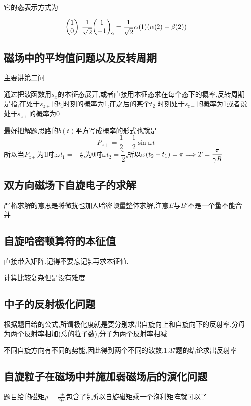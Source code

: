 \documentclass{article}
\begin{document}
            它的态表示方式为

            $$
            \mqty(1 \\ 0)_{1} \frac{1}{\sqrt{2}}\mqty(1 \\ -1)_{2} = \frac{1}{\sqrt{2}} \alpha(1)(\alpha(2) - \beta(2))
            $$

        \subsection{磁场中的平均值问题以及反转周期}
            主要讲第二问

            通过把波函数用$s_{x}$的本征态展开,或者直接用本征态求在每个态下的概率,反转周期是指,在处于$s_{z+}$的$t_{1}$时刻的概率为1,在之后的某个$t_{2}$
            时刻处于$s_{z-}$的概率为1或者说处于$s_{z+}$的概率为0
            
            最好把解题思路的$b(t)$平方写成概率的形式也就是
            $$
            P_{z+} = \frac{1}{2} - \frac{1}{2}\sin{\omega t}
            $$
            所以当$P_{z+}$为1时,$ \omega t_{1} = - \frac{\pi}{2}$,为0时$\omega t_{2} = \dfrac{\pi}{2}$,所以$\omega(t_{2} - t_{1}) = \pi  \Longrightarrow T = \dfrac{\pi}{\gamma B}$


        \subsection{双方向磁场下自旋电子的求解}
            严格求解的意思是将微扰也加入哈密顿量整体求解,注意$B$与$B'$不是一个量不能合并

        \subsection{自旋哈密顿算符的本征值}
            直接带入矩阵,记得不要忘记$\frac{\hbar}{2}$,再求本征值.

            计算比较复杂但是没有难度

        \subsection{中子的反射极化问题}
            根据题目给的公式,所谓极化度就是要分别求出自旋向上和自旋向下的反射率,分母为两个反射率相加(总的粒子数),分子为两个反射率相减

            不同自旋方向有不同的势能,因此得到两个不同的波数,1.37题的结论求出反射率

        \subsection{自旋粒子在磁场中并施加弱磁场后的演化问题}
            题目给的磁矩$\mu = \frac{e \hbar}{2 \mu c}$包含了$\frac{\hbar}{2}$,所以自旋磁矩乘一个泡利矩阵就可以了
\end{document}
